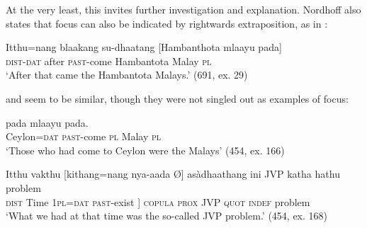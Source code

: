 At the very least, this invites further investigation and explanation.
Nordhoff also states that focus can also be indicated by rightwards extraposition, as in :


\ea\label{ex3.7.12} 
\gll Itthu=nang blaakang su-dhaatang [Hambanthota mlaayu pada]\\
  \textsc{dist}-\textsc{dat} after  \textsc{past}-come Hambantota Malay  \textsc{pl}\\
  `After that came the Hambantota Malays.'  (691, ex. 29)
\z


  and  seem to be similar, though they were not singled out as examples of focus:


\ea\label{ex3.7.13} 
\gll [Seelon=nang anà-dhaatang {\O}] pada mlaayu pada.\\
  Ceylon=\textsc{dat} \textsc{past}-come {}  \textsc{pl} Malay  \textsc{pl}\\
  `Those who had come to Ceylon were the Malays'  (454, ex. 166)
\z




\ea\label{ex3.7.14} 
\gll Itthu vakthu [kithang=nang nya-aada {\O}] asàdhaathang ini JVP katha hathu problem\\
 \textsc{dist} Time 1\textsc{pl}=\textsc{dat}  \textsc{past}-exist {}] \textsc{copula} \textsc{prox} JVP \textsc{quot} \textsc{indef} problem\\
 `What we had at that time was the so-called JVP problem.' (454, ex. 168)
\z


